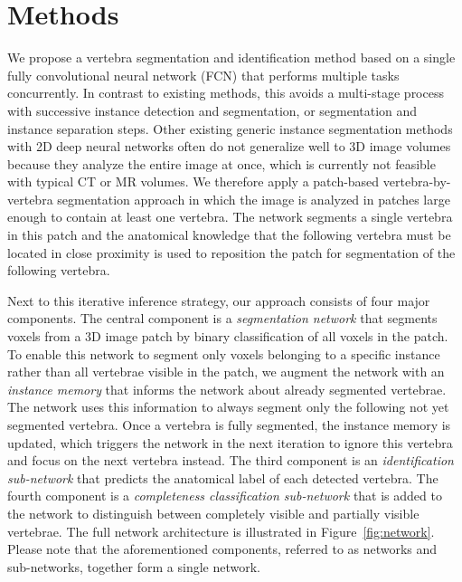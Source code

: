 \documentclass[authoryear,5p,final,times]{elsarticle}
\begin{document}
    \section{Methods}
        
    We propose a vertebra segmentation and identification method based on a single fully convolutional neural network (FCN) that performs multiple tasks concurrently. In contrast to existing methods, this avoids a multi-stage process with successive instance detection and segmentation, or segmentation and instance separation steps. Other existing generic instance segmentation methods with 2D deep neural networks often do not generalize well to 3D image volumes because they analyze the entire image at once, which is currently not feasible with typical CT or MR volumes. We therefore apply a patch-based vertebra-by-vertebra segmentation approach in which the image is analyzed in patches large enough to contain at least one vertebra. The network segments a single vertebra in this patch and the anatomical knowledge that the following vertebra must be located in close proximity is used to reposition the patch for segmentation of the following vertebra.
    
    Next to this iterative inference strategy, our approach consists of four major components. The central component is a \emph{segmentation network} that segments voxels from a 3D image patch by binary classification of all voxels in the patch. To enable this network to segment only voxels belonging to a specific instance rather than all vertebrae visible in the patch, we augment the network with an \emph{instance memory} that informs the network about already segmented vertebrae. The network uses this information to always segment only the following not yet segmented vertebra. Once a vertebra is fully segmented, the instance memory is updated, which triggers the network in the next iteration to ignore this vertebra and focus on the next vertebra instead. The third component is an \emph{identification sub-network} that predicts the anatomical label of each detected vertebra. The fourth component is a \emph{completeness classification sub-network} that is added to the network to distinguish between completely visible and partially visible vertebrae. The full network architecture is illustrated in Figure~\ref*{fig:network}. Please note that the aforementioned components, referred to as networks and sub-networks, together form a single network.
  
\end{document}
